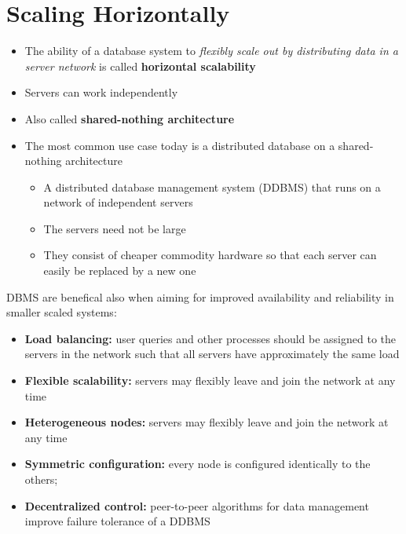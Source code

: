\section{Scaling Horizontally}
\begin{itemize}
    \item The ability of a database system to \textit{flexibly scale out by distributing data in a server network} is called \textbf{horizontal scalability}
    \item Servers can work independently
    \item Also called \textbf{shared-nothing architecture}
    \item The most common use case today is a distributed database on a shared-nothing architecture
    \begin{itemize}
        \item A distributed database management system (DDBMS) that runs on a network of independent servers
        \item The servers need not be large
        \item They consist of cheaper commodity hardware so that each server can easily be replaced by a new one
    \end{itemize}
\end{itemize}
DBMS are benefical also when aiming for improved availability and reliability in smaller scaled systems:
\begin{itemize}
    \item \textbf{Load balancing:} user queries and other processes should be assigned to the servers in the network such that all servers have approximately the same load
    \item \textbf{Flexible scalability:} servers may flexibly leave and join the network at any time
    \item \textbf{Heterogeneous nodes:} servers may flexibly leave and join the network at any time
    \item \textbf{Symmetric configuration:} every node is configured identically to the others;
    \item \textbf{Decentralized control:} peer-to-peer algorithms for data management improve failure tolerance of a DDBMS
\end{itemize}

